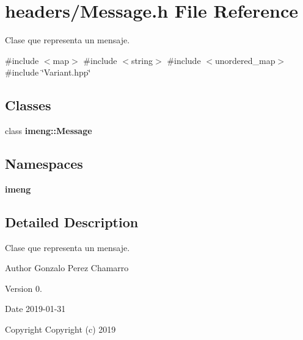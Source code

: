 \section{headers/\+Message.h File Reference}
\label{_message_8h}


Clase que representa un mensaje.  


{\ttfamily \#include $<$map$>$}\newline
{\ttfamily \#include $<$string$>$}\newline
{\ttfamily \#include $<$unordered\+\_\+map$>$}\newline
{\ttfamily \#include \char`\"{}Variant.\+hpp\char`\"{}}\newline
\subsection*{Classes}
\begin{DoxyCompactItemize}
\item 
class \textbf{ imeng\+::\+Message}
\end{DoxyCompactItemize}
\subsection*{Namespaces}
\begin{DoxyCompactItemize}
\item 
 \textbf{ imeng}
\end{DoxyCompactItemize}


\subsection{Detailed Description}
Clase que representa un mensaje. 

\begin{DoxyAuthor}{Author}
Gonzalo Perez Chamarro 
\end{DoxyAuthor}
\begin{DoxyVersion}{Version}
0. 
\end{DoxyVersion}
\begin{DoxyDate}{Date}
2019-\/01-\/31
\end{DoxyDate}
\begin{DoxyCopyright}{Copyright}
Copyright (c) 2019 
\end{DoxyCopyright}
